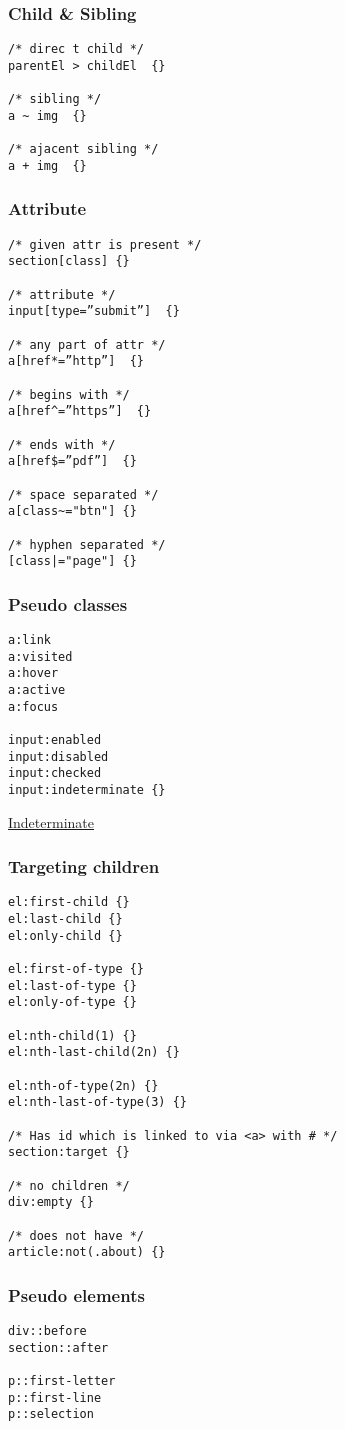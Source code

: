 \subsubsection{Child \& Sibling}

\begin{verbatim}
/* direc t child */
parentEl > childEl  {}

/* sibling */
a ~ img  {}

/* ajacent sibling */
a + img  {}
\end{verbatim}

\subsubsection{Attribute}

\begin{verbatim}
/* given attr is present */
section[class] {}

/* attribute */
input[type=”submit”]  {}

/* any part of attr */
a[href*=”http”]  {}

/* begins with */
a[href^=”https”]  {}

/* ends with */
a[href$=”pdf”]  {}

/* space separated */
a[class~="btn"] {}

/* hyphen separated */
[class|="page"] {}
\end{verbatim}

\subsubsection{Pseudo classes}

\begin{verbatim}
a:link
a:visited
a:hover
a:active
a:focus

input:enabled
input:disabled
input:checked
input:indeterminate {}
\end{verbatim}

\href{https://css-tricks.com/indeterminate-checkboxes/}{Indeterminate}

\subsubsection{Targeting children}

\begin{verbatim}
el:first-child {}
el:last-child {}
el:only-child {}

el:first-of-type {}
el:last-of-type {}
el:only-of-type {}

el:nth-child(1) {}
el:nth-last-child(2n) {}

el:nth-of-type(2n) {}
el:nth-last-of-type(3) {}

/* Has id which is linked to via <a> with # */
section:target {}

/* no children */
div:empty {}

/* does not have */
article:not(.about) {}
\end{verbatim}

\subsubsection{Pseudo elements}

\begin{verbatim}
div::before
section::after

p::first-letter
p::first-line
p::selection
\end{verbatim}
